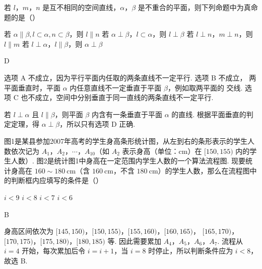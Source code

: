 \begin{problem}
若 \(l\)，\(m\)，\(n\) 是互不相同的空间直线，\(\alpha\)，\(\beta\) 是不重合的平面，则下列命题中为真命题的是（\quad）

\choices
    {若 \(\alpha \parallel \beta, l \subset \alpha, n \subset \beta\)，则 \(l \parallel n\)}
    {若 \(\alpha \perp \beta\)，\(l \subset \alpha\)，则 \(l \perp \beta\)}
    {若 \(l \perp n\)，\(m \perp n\)，则 \(l \parallel m\)}
    {若 \(l \perp \alpha\)，\(l \parallel \beta\)，则 \(\alpha \perp \beta\)}
\end{problem}

\begin{answer}
D
\end{answer}

\begin{solution}
选项 A 不成立，因为平行平面内任取的两条直线不一定平行. 选项 B 不成立，
两平面垂直时，平面 \(\alpha\) 内任意直线不一定垂直于平面 \(\beta\)，例如取两平面的
交线. 选项 C 也不成立，空间中分别垂直于同一直线的两条直线不一定平行.

若 \(l\perp\alpha\) 且 \(l\parallel\beta\)，则平面 \(\beta\) 内含有一条垂直于平面
\(\alpha\) 的直线. 根据平面垂直的判定定理，得 \(\alpha\perp\beta\)，所以只有选项 D
正确.
\end{solution}

\begin{problem}
图1是某县参加2007年高考的学生身高条形统计图，从左到右的条形表示的学生人数依次记为 \(A_{1}\)，\(A_{2}\)，\(\cdots\)，\(A_{10}\)（如 \(A_{2}\) 表示身高（单位：\(\mathrm{cm}\)）在 \([150,155)\) 内的学生人数）. 图2是统计图1中身高在一定范围内学生人数的一个算法流程图. 现要统计身高在 \(160 \sim 180 \mathrm{~cm}\)（含 \(160 \mathrm{~cm}\)，不含 \(180 \mathrm{~cm}\)）的学生人数，那么在流程图中的判断框内应填写的条件是（\quad）



\choices
    {\(i < 9\)}
    {\(i < 8\)}
    {\(i < 7\)}
    {\(i < 6\)}
\end{problem}

\begin{answer}
B
\end{answer}

\begin{solution}
身高区间依次为 \([145,150)\)，\([150,155)\)，\([155,160)\)，\([160,165)\)，
\([165,170)\)，\([170,175)\)，\([175,180)\)，\([180,185)\) 等. 因此需要累加
\(A_{4}\)，\(A_{5}\)，\(A_{6}\)，\(A_{7}\). 流程从 \(i=4\) 开始，每次累加后令 \(i=i+1\)，当
\(i=8\) 时停止，所以判断条件应为 \(i<8\)，故选 B.
\end{solution}

